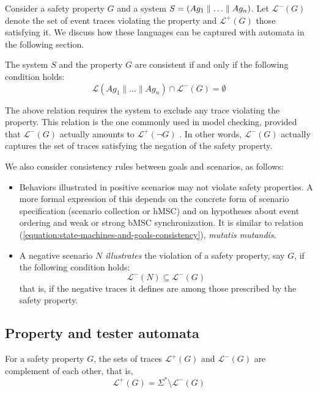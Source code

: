 Consider a safety property $G$ and a system $S = (Ag_1 \parallel \ldots \parallel Ag_n)$. Let $\mathcal{L}^{-}(G)$ denote the set of event traces violating the property and $\mathcal{L}^{+}(G)$ those satisfying it. We discuss how these languages can be captured with automata in the following section.

The system $S$ and the property $G$ are consistent if and only if the following condition holds:
\begin{equation}
\mathcal{L}(Ag_1 \parallel \ldots \parallel Ag_n) \cap \mathcal{L}^{-}(G) = \emptyset
\label{equation:state-machines-and-goals-consistency}
\end{equation}

The above relation requires the system to exclude any trace violating the property. This relation is the one commonly used in model checking, provided that $\mathcal{L}^{-}(G)$ actually amounts to $\mathcal{L}^{+}(\neg G)$ \cite{Clarke:1989}. In other words, $\mathcal{L}^{-}(G)$ actually captures the set of traces satisfying the negation of the safety property.

We also consider consistency rules between goals and scenarios, as follows:
\begin{itemize}
\item Behaviors illustrated in positive scenarios may not violate safety properties. A more formal expression of this depends on the concrete form of scenario specification (scenario collection or hMSC) and on hypotheses about event ordering and weak or strong bMSC synchronization. It is similar to relation (\ref{equation:state-machines-and-goals-consistency}), \emph{mutatis mutandis}.
\item A negative scenario $N$ \emph{illustrates} the violation of a safety property, say $G$, if the following condition holds:
\begin{equation}
\mathcal{L}^{-}(N) \subseteq \mathcal{L}^{-}(G)
\end{equation}
\noindent that is, if the negative traces it defines are among those prescribed by the safety property.
\end{itemize}

\subsection{Property and tester automata\label{subsection:background-property-and-tester-automata}}

For a safety property $G$, the sets of traces $\mathcal{L}^{+}(G)$ and $\mathcal{L}^{-}(G)$ are complement of each other, that is,
\begin{equation}
\mathcal{L}^{+}(G) = \Sigma^{*} \setminus \mathcal{L}^{-}(G)
\end{equation}

